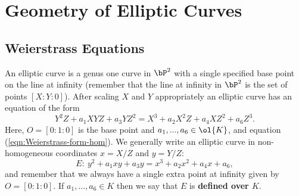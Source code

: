 \section{Geometry of Elliptic Curves}

\subsection{Weierstrass Equations}

An elliptic curve is a genus one curve in $\bP^2$ with a single specified base point on the line at infinity (remember that the line at infinity in $\bP^2$ is the set of points $[X:Y:0]$). After scaling $X$ and $Y$ appropriately an elliptic curve has an equation of the form
\begin{equation}\label{eqn:Weierstrass-form-hom}
	Y^2Z + a_1XYZ + a_3YZ^2 = X^3 + a_2X^2Z + a_4XZ^2+a_6Z^3.
\end{equation}
Here, $O = [0:1:0]$ is the base point and $a_1,...,a_6\in \ol{K}$, and equation (\ref{eqn:Weierstrass-form-hom}). We generally write an elliptic curve in non-homogeneous coordinates $x = X/Z$ and $y = Y/Z$:
\begin{equation}\label{eqn:Weierstrass-form}
	E:~ y^2 + a_1xy+a_3y = x^3 + a_2x^2 + a_4x + a_6,
\end{equation}
and remember that we always have a single extra point at infinity given by $O = [0:1:0]$. If $ a_1,...,a_6 \in K$ then we say that $E$ is \textbf{defined over $K$}.

